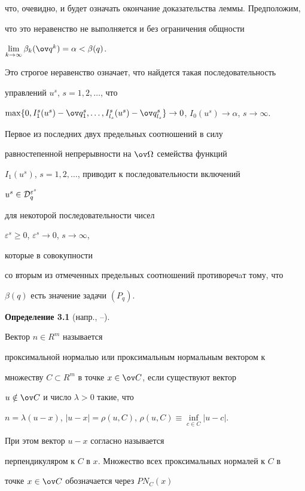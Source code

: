 \begin{pf}
что, очевидно, и будет означать окончание доказательства леммы. Предположим,


что это неравенство не выполняется и без ограничения общности


$\lim\limits_{k\to\infty}\beta_k(\ov q^k)=\alpha<\beta(q)$.


Это строгое неравенство означает, что найдется такая последовательность


управлений $u^s$, $s=1,2,\dotsc$, что


$\max\{0,I^s_1(u^s)-\ov q^s_1,\dotsc,I^s_{l_s}(u^s)-\ov q^s_{l_s}\}


\to 0$, $I_0(u^s)\to\alpha$, $s\to\infty$.


Первое из последних двух предельных соотношений в силу


равностепенной непрерывности на $\ov\Omega$ семейства функций


$I_1(u^s)$, $s=1,2,\dotsc$, приводит к последовательности включений


$u^s\in {\cal D}_q^{\varepsilon^s}$


для некоторой последовательности чисел


$\varepsilon^s\geq 0$, $\varepsilon^s\to 0$, $s\to\infty$,


которые в совокупности


со вторым из отмеченных предельных соотношений противоречaт тому, что


$\beta(q)$ есть значение задачи $(P_q)$.


\end{pf}





{\bf Определение 3.1} (напр., \cite{borweinstrojwas}--\cite{clarke}).


Вектор $n\in R^m$ называется


проксимальной нормалью или проксимальным нормальным вектором к


множеству $C\subset R^m$ в точке $x\in\ov C$, если существуют вектор


$u\notin\ov C$ и число $\lambda>0$ такие, что


$n=\lambda(u-x)$, $|u-x|=\rho(u,C)$, $\rho(u,C)\equiv


\inf\limits_{c\in C} |u-c|$.


При этом вектор $u-x$ согласно \cite{clarke} называется


перпендикуляром к $C$ в $x$. Множество всех проксимальных нормалей к $C$ в


точке $x\in\ov C$ обозначается через $PN_C(x)$


